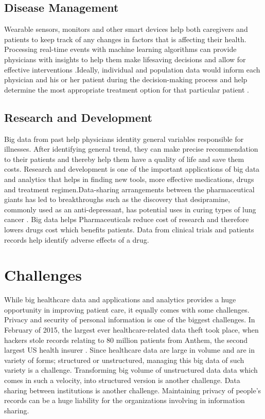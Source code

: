 \documentclass[sigconf]{acmart}
\begin{document}
\subsection{Disease Management} 
Wearable sensors, monitors and other smart devices help both caregivers and patients to keep track of any changes in factors that is affecting their health. Processing real-time events with machine learning algorithms can provide physicians with insights to help them make lifesaving decisions and allow for effective interventions \cite{www-mapr-com}.Ideally, individual and population data would inform each physician and his or her patient during the decision-making process and help determine the most appropriate treatment option for that particular patient \cite{www-link-springer-com}. 



\subsection{Research and Development}
Big data from past help physicians identity general variables responsible for illnesses. After identifying general trend, they can make precise recommendation to their patients and thereby help them have a quality of life and save them costs. 
Research and development is one of the important applications of big data and
analytics that helps in finding new tools, more effective medications, drugs 
and treatment regimen.Data-sharing arrangements between the pharmaceutical giants has led to breakthroughs such as the discovery that desipramine, commonly used as an anti-depressant, has potential uses in curing types of lung cancer \cite{www-forbes-com}. Big data helps Pharmaceuticals reduce cost of research and therefore lowers drugs cost which benefits patients. Data from clinical trials and patients records help identify adverse effects of a drug.
 
 




\section{Challenges}
While big healthcare data and applications and analytics provides a huge opportunity in improving patient care, it equally comes with some challenges. 
Privacy and security of personal information is one of the biggest challenges.
In February of 2015, the largest ever healthcare-related data theft took place, when hackers stole records relating to 80 million patients 
from Anthem, the second largest US health insurer \cite{www-forbes-com}.
Since healthcare data are large in volume and are in variety of forms; structured or unstructured, managing this big data of such variety is a challenge. Transforming big volume of unstructured data data which comes in such a velocity, into structured version is another challenge. Data sharing between institutions is another challenge. Maintaining privacy of people's records can be a huge liability for the organizations involving in information sharing.
\end{document}
